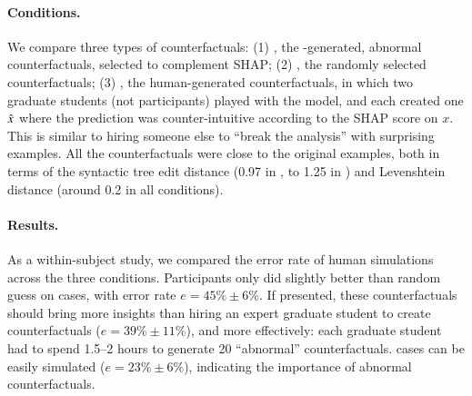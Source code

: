 \paragraph{Conditions.} 
We compare three types of counterfactuals:
(1) \cshap, the \sysname-generated, abnormal counterfactuals, selected to complement SHAP; 
(2) \crandom, the randomly selected \sysname counterfactuals; 
(3) \chuman, the human-generated counterfactuals, in which two graduate students (not participants) played with the model, and each created one $\hat{x}$ where the prediction was counter-intuitive according to the SHAP score on $x$.
This is similar to hiring someone else to ``break the analysis'' with surprising examples.
All the counterfactuals were close to the original examples, both in terms of the syntactic tree edit distance (0.97 in \cshap, to 1.25 in \chuman) and Levenshtein distance (around 0.2 in all conditions).

\paragraph{Results.}
As a within-subject study, we compared the error rate of human simulations across the three conditions.
Participants only did slightly better than random guess on \cshap cases, with error rate $e=45\%\pm6\%$.
If presented, these counterfactuals should bring more insights than hiring an expert graduate student to create counterfactuals ($e=39\%\pm11\%$), and more effectively: each graduate student had to spend 1.5--2 hours to generate 20 ``abnormal'' counterfactuals. 
\crandom cases can be easily simulated ($e=23\%\pm6\%$), indicating the importance of abnormal counterfactuals.

